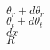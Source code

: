 \documentclass{report}
\begin{document}
$\theta_r + d\theta_r$\\
$\theta_t + d\theta_t$\\
$dx$\\
$R$\\
\end{document}
